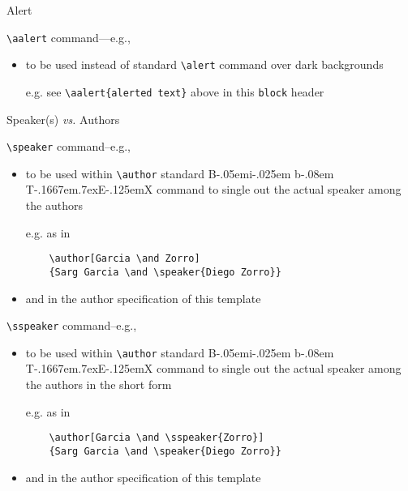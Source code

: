 \documentclass[presentation]{beamer}\mode<presentation>{\usetheme{AMSBolognaFC}}
\def\BibTeX{{\rm B\kern-.05em{\sc i\kern-.025em b}\kern-.08em
    T\kern-.1667em\lower.7ex\hbox{E}\kern-.125emX}}
\begin{document}
\begin{frame}[c,fragile]{Alert}
%
\begin{block}{\texttt{\textbackslash{}aalert} command---e.g., }
\begin{itemize}
	\item to be used instead of standard \texttt{\textbackslash{}alert} command over dark backgrounds
	\item[e.g.] see \verb|\aalert{alerted text}| above in this \texttt{block} header
\end{itemize}
\end{block}
%
\end{frame}

\begin{frame}{Speaker(s) \emph{vs.} Authors}
%
\begin{exampleblock}{\texttt{\textbackslash{}speaker} command--e.g., }
\begin{itemize}
	\item to be used within \texttt{\textbackslash{}author} standard \BibTeX{} command to single out the actual speaker among the authors
	\item[e.g.] as in
\begin{verbatim}
	\author[Garcia \and Zorro]
	{Sarg Garcia \and \speaker{Diego Zorro}}
\end{verbatim}
	\item and in the author specification of this template
\end{itemize}
\end{exampleblock}
%
\begin{block}{\texttt{\textbackslash{}sspeaker} command--e.g., }
\begin{itemize}
	\item to be used within \texttt{\textbackslash{}author} standard \BibTeX{} command to single out the actual speaker among the authors in the short form
	\item[e.g.] as in
\begin{verbatim}
	\author[Garcia \and \sspeaker{Zorro}]
	{Sarg Garcia \and \speaker{Diego Zorro}}
\end{verbatim}
	\item and in the author specification of this template
\end{itemize}
\end{block}

\end{frame}
\end{document}
